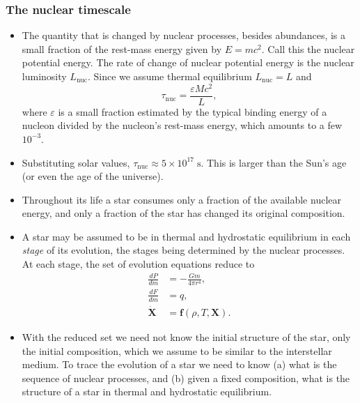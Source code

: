 \documentclass[10pt,amsmath,amssymb,aps,pra]{revtex4-2}
\newcommand{\unit}[1]{\;\mathrm{#1}}
\newcommand{\sub}[1]{_{\text{#1}}}
\newcommand{\V}[1]{\mathbf{#1}}
\newcommand{\eps}{\varepsilon}
\begin{document}
\subsubsection*{The nuclear timescale}
\begin{itemize}
\item The quantity that is changed by nuclear processes, besides abundances, is
a small fraction of the rest-mass energy given by $E=mc^2$. Call this the
nuclear potential energy. The rate of change of nuclear potential energy is the
nuclear luminosity $L\sub{nuc}$. Since we assume thermal equilibrium
$L\sub{nuc}=L$ and
\begin{equation}
\tau\sub{nuc} = \frac{\eps{M}c^2}{L},
\end{equation}
where $\eps$ is a small fraction estimated by the typical binding energy of a
nucleon divided by the nucleon's rest-mass energy, which amounts to a few
$10^{-3}$.

\item Substituting solar values,
$\tau\sub{nuc}\approx{5}\times{10^{17}}\unit{s}$. This is larger than the Sun's
age (or even the age of the universe).

\item Throughout its life a star consumes only a fraction of the available
nuclear energy, and only a fraction of the star has changed its original
composition.

\item A star may be assumed to be in thermal and hydrostatic equilibrium in each
\emph{stage} of its evolution, the stages being determined by the nuclear
processes. At each stage, the set of evolution equations reduce to
\begin{subequations}
\begin{align}\label{eq:set2}
\frac{dP}{dm} &= -\frac{Gm}{4\pi{r}^4},\\
\frac{dF}{dm} &= q,\\
\dot{\V{X}} &= \V{f}(\rho,T,\V{X}).
\end{align}
\end{subequations}

\item With the reduced set we need not know the initial structure of the star,
only the initial composition, which we assume to be similar to the interstellar
medium. To trace the evolution of a star we need to know (a) what is the
sequence of nuclear processes, and (b) given a fixed composition, what is the
structure of a star in thermal and hydrostatic equilibrium.
\end{itemize}
\end{document}
